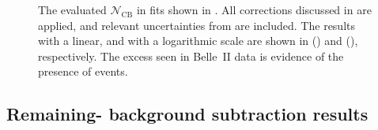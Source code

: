 \begin{figure}[hbtp!]
    \centering
    \caption{\label{fig:final_fit_results}
        The evaluated $\mathcal{N}_{\mathrm{CB}}$ in fits shown in .
        All corrections discussed in  are applied, 
        and relevant uncertainties from  are included.
        The results with a linear, and with a logarithmic scale are shown in () and (), respectively.
        The excess seen in Belle~II data is evidence of the presence of \BtoXsdgamma events.
    }
\end{figure}

\subsection{Remaining-\texorpdfstring{\BB}{BB} background subtraction results}\label{sec:background_subtraction_results}

